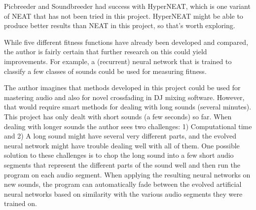 Picbreeder \citep{secretan2008} and Soundbreeder \citep{ye2014} had success with HyperNEAT, which is one variant of NEAT that has not been tried in this project. HyperNEAT might be able to produce better results than NEAT in this project, so that’s worth exploring.

While five different fitness functions have already been developed and compared, the author is fairly certain that further research on this could yield improvements. For example, a (recurrent) neural network that is trained to classify a few classes of sounds could be used for measuring fitness.

The author imagines that methods developed in this project could be used for mastering audio and also for novel crossfading in DJ mixing software. However, that would require smart methods for dealing with long sounds (several minutes). This project has only dealt with short sounds (a few seconds) so far. When dealing with longer sounds the author sees two challenges: 1) Computational time and 2) A long sound might have several very different parts, and the evolved neural network might have trouble dealing well with all of them. One possible solution to these challenges is to chop the long sound into a few short audio segments that represent the different parts of the sound well and then run the program on each audio segment. When applying the resulting neural networks on new sounds, the program can automatically fade between the evolved artificial neural networks based on similarity with the various audio segments they were trained on.
